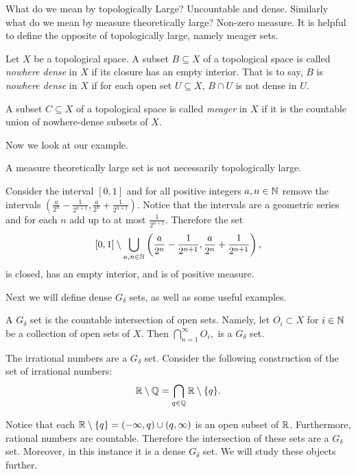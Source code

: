 
What do we mean by topologically Large? Uncountable and dense.  Similarly what do we mean by measure theoretically large?  Non-zero measure.  It is helpful to define the opposite of topologically large, namely meager sets.


\begin{definition}  Let $X$ be a topological space.  A subset $B \subseteq X$ of a topological space is called \textit{nowhere dense} in $X$ if its closure has an empty interior.  That is to say, $B$ is \textit{nowhere dense} in $X$ if for each open set $U\subseteq X$, $B\cap U$ is not dense in $U$.      
\end{definition}

\begin{definition}[Meager]  A subset $C \subseteq X$ of a topological space is called \textit{meager} in $X$ if it is the countable union of nowhere-dense subsets of $X$.    
\end{definition}
Now we look at our example.  
\begin{example}A measure theoretically large set is not necessarily topologically large.

Consider the interval $[0,1]$ and for all positive integers $a,n \in \mathbb{N}$ remove the intervals $(\frac{a}{2^n} - \frac{1}{2^{n+1}},\frac{a}{2^n} + \frac{1}{2^{n+1}})$.  Notice that the intervals are a geometric series and for each $n$ add up to at most $\frac{1}{2^{n+1}}$.  Therefore the set 
$$[0,1] \setminus \bigcup_{a,n \in \mathbb{N}} \left(\frac{a}{2^n} - \frac{1}{2^{n+1}},\frac{a}{2^n} + \frac{1}{2^{n+1}}\right),$$
is closed, has an empty interior, and is of positive measure.  
\end{example}

Next we will define dense $G_\delta$ sets, as well as some useful examples.  
\begin{definition}
    A $G_\delta$ set is the countable intersection of open sets.  Namely, let $O_i \subset X$ for $i \in \mathbb{N}$ be a collection of open sets of $X$.  Then 
    $\bigcap_{n=1}^\infty O_i,$ is a $G_\delta$ set.  
\end{definition}

\begin{example}
    The irrational numbers are a $G_\delta$ set.  Consider the following construction of the set of irrational numbers:
    $$\mathbb{R} \setminus \mathbb{Q} = \bigcap_{q \in \mathbb{Q}}\mathbb{R} \setminus \{q\}.$$
\end{example}
Notice that each $\mathbb{R}\setminus \{q\} = (-\infty, q) \cup (q, \infty)$ is an open subset of $\mathbb{R}$.  Furthermore, rational numbers are countable.  Therefore the intersection of these sets are a $G_\delta$ set.  Moreover, in this instance it is a dense $G_\delta$ set.  We will study these objects further.  

